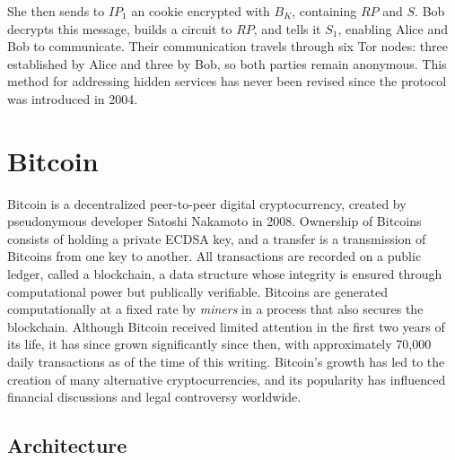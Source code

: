 She then sends to $IP_{1}$ an cookie encrypted with $B_{K}$, containing $RP$ and $S$. Bob decrypts this message, builds a circuit to $RP$, and tells it $S_{1}$, enabling Alice and Bob to communicate. Their communication travels through six Tor nodes: three established by Alice and three by Bob, so both parties remain anonymous. This method for addressing hidden services has never been revised since the protocol was introduced in 2004.\cite{NicolussiThesis2011}





\section{Bitcoin} 

Bitcoin is a decentralized peer-to-peer digital cryptocurrency, created by pseudonymous developer Satoshi Nakamoto in 2008. Ownership of Bitcoins consists of holding a private ECDSA key, and a transfer is a transmission of Bitcoins from one key to another. All transactions are recorded on a public ledger, called a blockchain, a data structure whose integrity is ensured through computational power but publically verifiable. Bitcoins are generated computationally at a fixed rate by \textit{miners} in a process that also secures the blockchain. Although Bitcoin received limited attention in the first two years of its life, it has since grown significantly since then, with approximately 70,000 daily transactions as of the time of this writing. Bitcoin's growth has led to the creation of many alternative cryptocurrencies, and its popularity has influenced financial discussions and legal controversy worldwide.

\subsection{Architecture}

